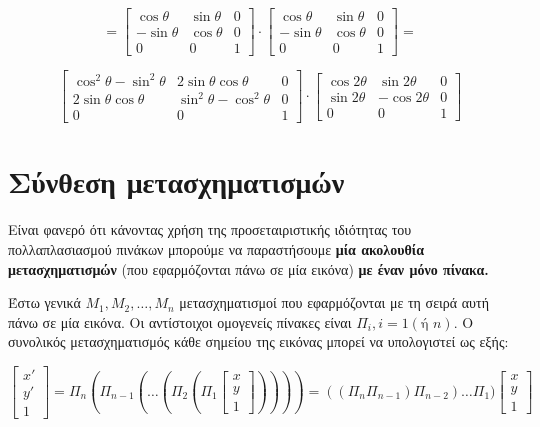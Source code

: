 \[
=
\begin{bmatrix}
\cos \theta & \sin \theta & 0 \\
-\sin \theta & \cos \theta & 0 \\
0 & 0 & 1
\end{bmatrix}
\cdot
\begin{bmatrix}
\cos \theta & \sin \theta & 0 \\
-\sin \theta & \cos \theta & 0 \\
0 & 0 & 1
\end{bmatrix}
=
\]

\[
\begin{bmatrix}
\cos^2\theta - \sin^2\theta & 2\sin\theta\cos\theta & 0 \\
2\sin\theta\cos\theta & \sin^2\theta - \cos^2\theta & 0 \\
0 & 0 & 1
\end{bmatrix}
\cdot
\begin{bmatrix}
\cos 2\theta & \sin 2\theta & 0 \\
\sin 2\theta & -\cos 2\theta & 0 \\
0 & 0 & 1
\end{bmatrix}
\]

\section{Σύνθεση μετασχηματισμών}

Είναι φανερό ότι κάνοντας χρήση της προσεταιριστικής ιδιότητας του πολλαπλασιασμού πινάκων μπορούμε να παραστήσουμε \textbf{μία ακολουθία μετασχηματισμών} (που εφαρμόζονται πάνω σε μία εικόνα) \textbf{με έναν μόνο πίνακα.}

Έστω γενικά $M_1, M_2, \ldots, M_n$ μετασχηματισμοί που εφαρμόζονται με τη σειρά αυτή πάνω σε μία εικόνα. Οι αντίστοιχοι ομογενείς πίνακες είναι $\Pi_i, i=1(\text{ή } n)$. Ο συνολικός μετασχηματισμός κάθε σημείου της εικόνας μπορεί να υπολογιστεί ως εξής:

\[
\begin{bmatrix}
x' \\ y' \\ 1
\end{bmatrix}
=
\Pi_n (\Pi_{n-1} (\ldots (\Pi_2 (\Pi_1
\begin{bmatrix}
x \\ y \\ 1
\end{bmatrix}))))
=
((\Pi_n \Pi_{n-1}) \Pi_{n-2}) \ldots \Pi_1)
\begin{bmatrix}
x \\ y \\ 1
\end{bmatrix}
\]

